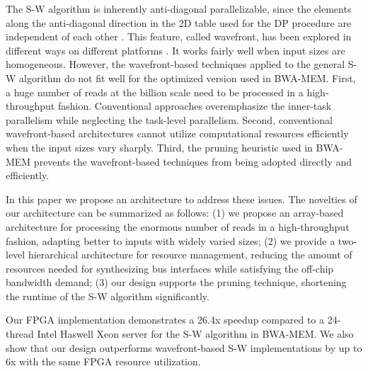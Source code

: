 The S-W algorithm is inherently anti-diagonal parallelizable, since the elements along the anti-diagonal direction in the 2D table used for the DP procedure are independent of each other \cite{Edmiston1988}. 
This feature, called wavefront, has been explored in different ways on different platforms \cite{Preusser2012}\cite{RaceLogic}\cite{Zhang2007}\cite{Lam2013}. 
It works fairly well when input sizes are homogeneous. 
However, the wavefront-based techniques applied to the general S-W algorithm do not fit well for the optimized version used in BWA-MEM. 
First, a huge number of reads at the billion scale need to be processed in a high-throughput fashion. 
Conventional approaches overemphasize the inner-task parallelism while neglecting the task-level parallelism. 
Second, conventional wavefront-based architectures cannot utilize computational resources efficiently when the input sizes vary sharply. 
Third, the pruning heuristic used in BWA-MEM prevents the wavefront-based techniques from being adopted directly and efficiently.

In this paper we propose an architecture to address these issues.
The novelties of our architecture can be summarized as follows: 
(1) we propose an array-based architecture for processing the enormous number of reads in a high-throughput fashion, adapting better to inputs with widely varied sizes; 
(2) we provide a two-level hierarchical architecture for resource management, reducing the amount of resources needed for synthesizing bus interfaces while satisfying the off-chip bandwidth demand;
(3) our design supports the pruning technique, shortening the runtime of the S-W algorithm significantly. 

Our FPGA implementation demonstrates a 26.4x speedup compared to a 24-thread Intel Haswell Xeon server for the S-W algorithm in BWA-MEM. 
We also show that our design outperforms wavefront-based S-W implementations by up to 6x with the same FPGA resource utilization.
